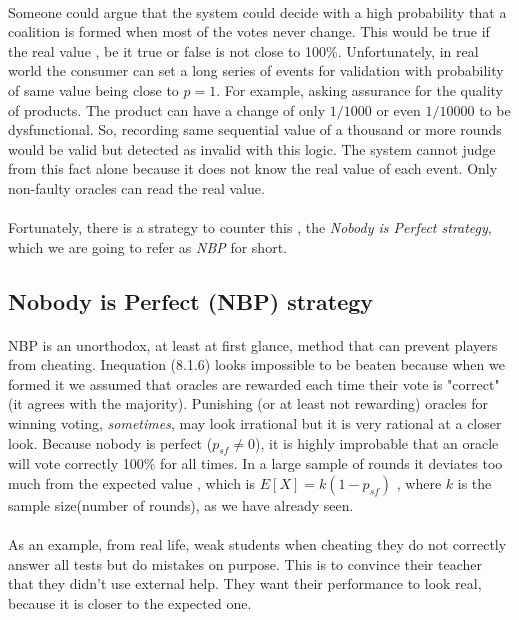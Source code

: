 \documentclass{article}
\begin{document}
{\paragraph{ } 
Someone could argue that the system could decide with a high probability that a coalition is formed when most of the votes never change. This would be true if the real value , be it true or false is not close to 100\%. Unfortunately, in real world the consumer can set a long series of events for validation with probability of same value being close to $p=1$. For example, asking assurance for the quality of products. The product can have a change of only $1/1000$ or even $1/10000$ to be dysfunctional. So, recording same sequential value of a thousand or more rounds would be valid but detected as invalid with this logic. The system cannot judge from this fact alone because it does not know the real value of each event. Only non-faulty oracles can read the real value.
\paragraph{ } 
Fortunately, there is a strategy to counter this , the \emph{Nobody is Perfect strategy}, which we are going to refer as \emph{NBP} for short.


\subsection{Nobody is Perfect (NBP) strategy}
\label{sec:nbp}
\paragraph{ }

NBP is an unorthodox, at least at first glance, method that can prevent players from cheating. Inequation (8.1.6) looks impossible to be beaten because when we formed it we assumed that oracles are rewarded each time their vote is "correct" (it agrees with the majority). Punishing (or at least not rewarding) oracles for winning voting, \emph{sometimes}, may look irrational but it is very rational at a closer look. Because nobody is perfect ($p_{sf}\neq0$), it is highly improbable that an oracle will vote correctly 100\% for all times. In a large sample of rounds it deviates too much from the expected value , which is $E[X]=k(1-p_{sf})$ , where $k$ is the sample size(number of rounds), as we have already seen.
\paragraph{ }
As an example, from real life, weak students when cheating they do not correctly answer all tests but do mistakes on purpose. This is to convince their teacher that they didn't use external help. They want their performance to look real, because it is closer to the expected one.
}
\end{document}
